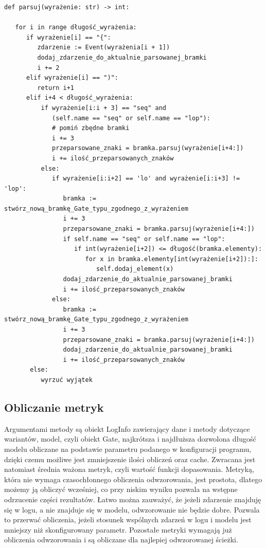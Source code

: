 \lstset{caption=Parser gramatyki, captionpos=b}
\lstset{label=src:passive, frame=single}
\begin{lstlisting}[escapeinside=``]
def parsuj(wyrażenie: str) -> int:

   for i in range długość_wyrażenia:
      if wyrażenie[i] == "{":
         zdarzenie := Event(wyrażenia[i + 1])
         dodaj_zdarzenie_do_aktualnie_parsowanej_bramki 
         i += 2
      elif wyrażenie[i] == ")":
         return i+1
      elif i+4 < długość_wyrażenia:
          if wyrażenie[i:i + 3] == "seq" and 
             (self.name == "seq" or self.name == "lop"):
             # pomiń zbędne bramki
             i += 3
             przeparsowane_znaki = bramka.parsuj(wyrażenie[i+4:])
             i += ilość_przeparsowanych_znaków
          else:
             if wyrażenie[i:i+2] == 'lo' and wyrażenie[i:i+3] != 'lop':  
                bramka := stwórz_nową_bramkę_Gate_typu_zgodnego_z_wyrażeniem 
                i += 3
                przeparsowane_znaki = bramka.parsuj(wyrażenie[i+4:])
                if self.name == "seq" or self.name == "lop":
                   if int(wyrażenie[i+2]) <= długość(bramka.elementy):
                      for x in bramka.elementy[int(wyrażenie[i+2]):]:
                         self.dodaj_element(x)
                dodaj_zdarzenie_do_aktualnie_parsowanej_bramki 
                i += ilość_przeparsowanych_znaków
             else:
                bramka := stwórz_nową_bramkę_Gate_typu_zgodnego_z_wyrażeniem 
                i += 3
                przeparsowane_znaki = bramka.parsuj(wyrażenie[i+4:])
                dodaj_zdarzenie_do_aktualnie_parsowanej_bramki 
                i += ilość_przeparsowanych_znaków
       else:
          wyrzuć wyjątek
\end{lstlisting}

\subsection{Obliczanie metryk}
Argumentami metody są obiekt LogInfo zawierający dane i metody dotyczące wariantów, model, czyli obiekt Gate, najkrótsza i najdłuższa dozwolona długość modelu obliczane na podstawie parametru podanego w konfiguracji programu, dzięki czemu możliwe jest zmniejszenie ilości obliczeń oraz cache. Zwracana jest natomiast średnia ważona metryk, czyli wartość funkcji dopasowania. Metryką, która nie wymaga czasochłonnego obliczenia odwzorowania, jest prostota, dlatego możemy ją obliczyć wcześniej, co przy niskim wyniku pozwala na wstępne odrzucenie części rezultatów. Łatwo można zauważyć, że jeżeli zdarzenie znajduję się w logu, a nie znajduje się w modelu, odwzorowanie nie będzie dobre. Pozwala to przerwać obliczenia, jeżeli stosunek wspólnych zdarzeń w logu i modelu jest mniejszy niż skonfigurowany parametr. Pozostałe metryki wymagają już obliczenia odwzorowania i są obliczane dla najlepiej odwzorowanej ścieżki. 

